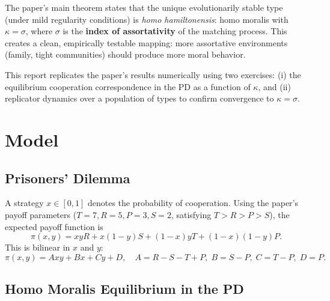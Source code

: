 \documentclass[12pt]{article}
\begin{document}
The paper's main theorem states that the unique evolutionarily stable type (under
mild regularity conditions) is \emph{homo hamiltonensis}: homo moralis with
$\kappa = \sigma$, where $\sigma$ is the \textbf{index of assortativity} of the
matching process. This creates a clean, empirically testable mapping: more
assortative environments (family, tight communities) should produce more moral
behavior.

This report replicates the paper's results numerically using two exercises:
(i) the equilibrium cooperation correspondence in the PD as a function of
$\kappa$, and (ii) replicator dynamics over a population of types to confirm
convergence to $\kappa = \sigma$.

\section{Model}

\subsection{Prisoners' Dilemma}

A strategy $x \in [0,1]$ denotes the probability of cooperation. Using the
paper's payoff parameters ($T=7, R=5, P=3, S=2$, satisfying $T>R>P>S$), the
expected payoff function is
\begin{equation}
    \pi(x,y) = xyR + x(1-y)S + (1-x)yT + (1-x)(1-y)P.
\end{equation}
This is bilinear in $x$ and $y$:
\begin{equation}
    \pi(x,y) = Axy + Bx + Cy + D,
    \quad A = R-S-T+P,\; B=S-P,\; C=T-P,\; D=P.
\end{equation}

\subsection{Homo Moralis Equilibrium in the PD}
\end{document}
